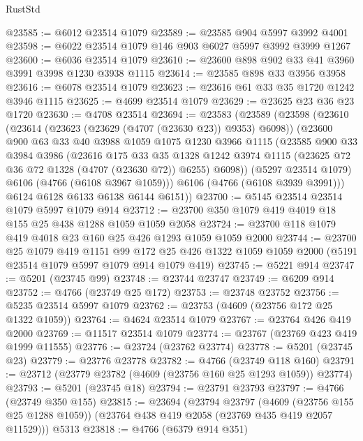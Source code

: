 \begin{lexlean}{RustStd}
\begin{coremodule}
@23585 := @6012 @23514 @1079
@23589 := @23585 @904 @5997 @3992 @4001
@23598 := @6022 @23514 @1079 @146 @903 @6027 @5997 @3992 @3999 @1267
@23600 := @6036 @23514 @1079
@23610 := @23600 @898 @902 @33 @41 @3960 @3991 @3998 @1230 @3938 @1115
@23614 := @23585 @898 @33 @3956 @3958
@23616 := @6078 @23514 @1079
@23623 := @23616 @61 @33 @35 @1720 @1242 @3946 @1115
@23625 := @4699 @23514 @1079
@23629 := @23625 @23 @36 @23 @1720
@23630 := @4708 @23514
@23694 := @23583
    (@23589
      (@23598
        (@23610
          (@23614 (@23623 (@23629 (@4707 (@23630 @23)) @9353) @6098))
          (@23600
            @900
            @63
            @33
            @40
            @3988
            @1059
            @1075
            @1230
            @3966
            @1115
            (@23585
              @900
              @33
              @3984
              @3986
              (@23616
                @175
                @33
                @35
                @1328
                @1242
                @3974
                @1115
                (@23625 @72 @36 @72 @1328 (@4707 (@23630 @72)) @6255)
                @6098))
            (@5297 @23514 @1079)
            @6106
            (@4766 (@6108 @3967 @1059)))
          @6106
          (@4766 (@6108 @3939 @3991)))
        @6124
        @6128
        @6133
        @6138
        @6144
        @6151))
@23700 := @5145 @23514 @23514 @1079 @5997 @1079 @914
@23712 := @23700 @350 @1079 @419 @4019 @18 @155 @25 @438 @1288 @1059 @1059 @2058
@23724 := @23700 @118 @1079 @419 @4018 @23 @160 @25 @426 @1293 @1059 @1059 @2000
@23744 := @23700
    @25
    @1079
    @419
    @1151
    @99
    @172
    @25
    @426
    @1322
    @1059
    @1059
    @2000
    (@5191 @23514 @1079 @5997 @1079 @914 @1079 @419)
@23745 := @5221 @914
@23747 := @5201 (@23745 @99)
@23748 := @23744 @23747
@23749 := @6209 @914
@23752 := @4766 (@23749 @25 @172)
@23753 := @23748 @23752
@23756 := @5235 @23514 @5997 @1079
@23762 := @23753 (@4609 (@23756 @172 @25 @1322 @1059))
@23764 := @4624 @23514 @1079
@23767 := @23764 @426 @419 @2000
@23769 := @11517 @23514 @1079
@23774 := @23767 (@23769 @423 @419 @1999 @11555)
@23776 := @23724 (@23762 @23774)
@23778 := @5201 (@23745 @23)
@23779 := @23776 @23778
@23782 := @4766 (@23749 @118 @160)
@23791 := @23712 (@23779 @23782 (@4609 (@23756 @160 @25 @1293 @1059)) @23774)
@23793 := @5201 (@23745 @18)
@23794 := @23791 @23793
@23797 := @4766 (@23749 @350 @155)
@23815 := @23694
    (@23794
      @23797
      (@4609 (@23756 @155 @25 @1288 @1059))
      (@23764 @438 @419 @2058 (@23769 @435 @419 @2057 @11529)))
    @5313
@23818 := @4766 (@6379 @914 @351)

\end{coremodule}
\end{lexlean}
